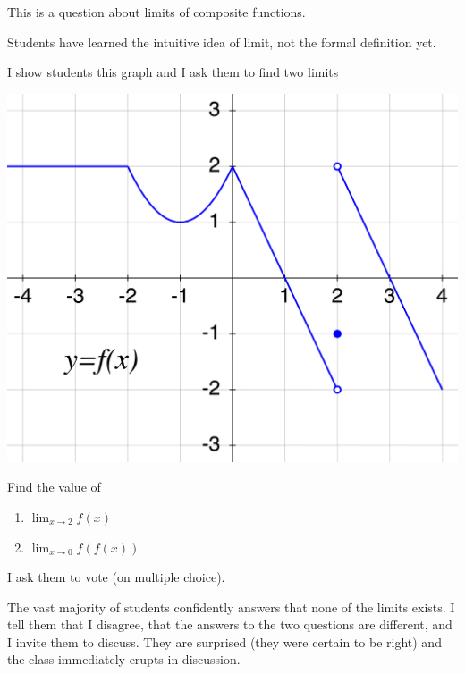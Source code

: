 \documentclass[11pt]{article}
\newcommand {\DS} [1] {${\displaystyle #1}$}
\begin{document}
\begin{example} \label{limits} This is a question about limits of composite functions.
\begin{background}
Students have learned the intuitive idea of limit, not the formal definition yet.
\end{background}
\begin{question}
I show students this graph and I ask them to find two limits

\begin{center}
\hspace{2cm}\begin{minipage}{0.5\textwidth}
	\includegraphics[scale=.4]{EX2a}
\end{minipage}
\begin{minipage}{0.2\textwidth}
Find the value of 
\begin{enumerate}
	\item  \DS{\lim_{x \to 2} f(x)}
	\item  \DS{\lim_{x \to 0} f(f(x))}
\end{enumerate}
\end{minipage}

\end{center}
I ask them to vote (on multiple choice).  
\end{question}
\begin{comments}
The vast majority of students confidently answers that none of the limits exists.  I tell them that I disagree, that the answers to the two questions are different, and I invite them to discuss.    They are surprised (they were certain to be right) and the class immediately erupts in discussion.    


\end{comments}
\end{example}
\end{document}
